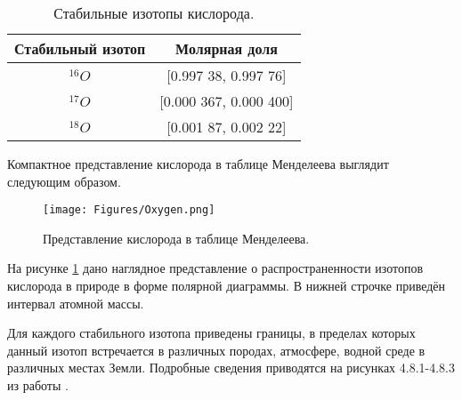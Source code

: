 \documentclass[a5paper,openany]{book}
\begin{document}

\begin{table}[h!]
	\centering
	\caption{Стабильные изотопы кислорода.} 
	\medskip 
	\begin{tabular}{|c|c|}
		\hline
		Стабильный  изотоп & Молярная доля \\
		\hline 
		$^{16}O$ & [0.997 38, 0.997 76] \\
		$^{17}O$ & [0.000 367, 0.000 400] \\
		$^{18}O$ & [0.001 87, 0.002 22] \\			
		\hline
	\end{tabular}
	\label{IUPACOxygen}
\end{table} 


Компактное представление кислорода в таблице Менделеева выглядит следующим образом.

\begin{figure}[ht] 
	\centering\small
	\texttt{[image: Figures/Oxygen.png]}
	\caption{Представление кислорода в таблице Менделеева.} 
	\label{f:Oxygen}
\end{figure}	
На рисунке \ref{f:Oxygen} дано наглядное представление о распространенности изотопов кислорода в природе в форме полярной диаграммы. В нижней строчке приведён интервал атомной массы.

Для каждого стабильного изотопа приведены границы, в пределах которых данный изотоп 
встречается в различных породах, атмосфере, водной среде в различных местах Земли. 
Подробные сведения приводятся на рисунках 4.8.1-4.8.3 из работы \cite{IUPAC}. 



\end{document}
